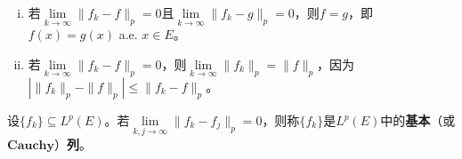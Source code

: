\documentclass[../../main.tex]{subfiles}%
\begin{document}
\begin{proposition}
\begin{enumerate}[(i)]
\item 若$\lim\limits_{k\to\infty}\|f_k-f\|_p=0$且$\lim\limits_{k\to\infty}\|f_k-g\|_p=0$，则$f=g$，即$f(x)=g(x)$ a.e. $x\in E$。
\item 若$\lim\limits_{k\to\infty}\|f_k-f\|_p=0$，则$\lim\limits_{k\to\infty}\|f_k\|_p=\|f\|_p$，因为$|\|f_k\|_p-\|f\|_p|\leqslant\|f_k-f\|_p$。
\end{enumerate}
\end{proposition}

\begin{definition}
设$\{f_k\}\subseteq L^p(E)$。若$\lim\limits_{k,j\to\infty}\|f_k-f_j\|_p=0$，则称$\{f_k\}$是$L^p(E)$中的\textbf{基本}（或$\mathbf{Cauchy}$）\textbf{列}。
\end{definition}
\end{document}
